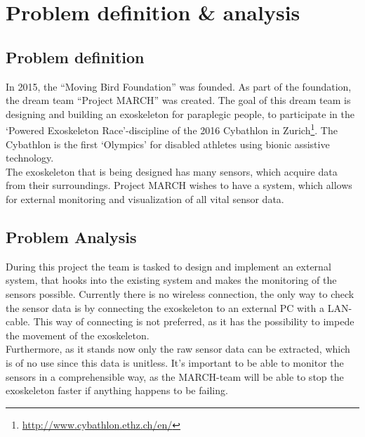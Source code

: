 \section{Problem definition \& analysis} \label{sec:probdef}
\subsection{Problem definition}
In 2015, the ``Moving Bird Foundation'' was founded. As part of the foundation, the dream team ``Project MARCH'' was created. The goal of this dream team is designing and building an exoskeleton for paraplegic people, to participate in the `Powered Exoskeleton Race'-discipline of the 2016 Cybathlon in Zurich\footnote{\url{http://www.cybathlon.ethz.ch/en/}}. The Cybathlon is the first `Olympics' for disabled athletes using bionic assistive technology.\\ 
The exoskeleton that is being designed has many sensors, which acquire data from their surroundings. Project MARCH wishes to have a system, which allows for external monitoring and visualization of all vital sensor data.

\subsection{Problem Analysis}
During this project the team is tasked to design and implement an external system, that hooks into the existing system and makes the monitoring of the sensors possible. Currently there is no wireless connection, the only way to check the sensor data is by connecting the exoskeleton to an external PC with a LAN-cable. This way of connecting is not preferred, as it has the possibility to impede the movement of the exoskeleton.\\ Furthermore, as it stands now only the raw sensor data can be extracted, which is of no use since this data is unitless. It's important to be able to monitor the sensors in a comprehensible way, as the MARCH-team will be able to stop the exoskeleton faster if anything happens to be failing.